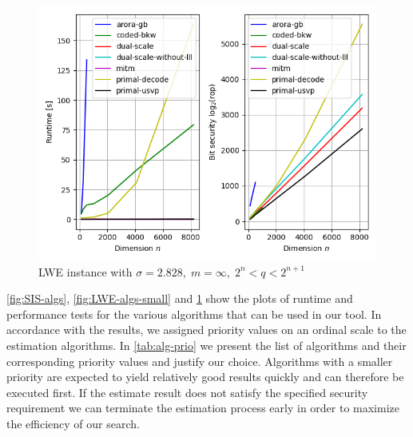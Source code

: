 \begin{figure}[h]
    \centering
    \includegraphics[width=1\textwidth]{graphics/LWE_stddev=2,828_plots_200s.png}
    \caption{LWE instance with $\sigma=2.828,\; m=\infty, \; 2^{n} < q < 2^{n+1}$}\label{fig:LWE-algs-large}
\end{figure}
\cref{fig:SIS-algs}, \ref{fig:LWE-algs-small} and \ref{fig:LWE-algs-large} show the plots of runtime and performance tests for the various algorithms that can be used in our tool. In accordance with the results, we assigned priority values on an ordinal scale to the estimation algorithms. In \cref{tab:alg-prio} we present the list of algorithms and their corresponding priority values and justify our choice. Algorithms with a smaller priority are expected to yield relatively good results quickly and can therefore be executed first. If the estimate result does not satisfy the specified security requirement we can terminate the estimation process early in order to maximize the efficiency of our search.

